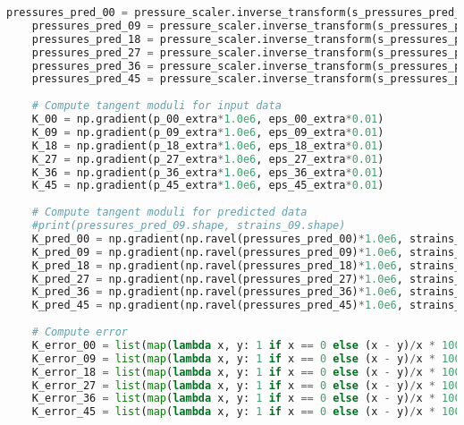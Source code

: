 \begin{lstlisting}[language=Python]
    pressures_pred_00 = pressure_scaler.inverse_transform(s_pressures_pred_00.reshape(-1,1))
    pressures_pred_09 = pressure_scaler.inverse_transform(s_pressures_pred_09.reshape(-1,1))
    pressures_pred_18 = pressure_scaler.inverse_transform(s_pressures_pred_18.reshape(-1,1))
    pressures_pred_27 = pressure_scaler.inverse_transform(s_pressures_pred_27.reshape(-1,1))
    pressures_pred_36 = pressure_scaler.inverse_transform(s_pressures_pred_36.reshape(-1,1))
    pressures_pred_45 = pressure_scaler.inverse_transform(s_pressures_pred_45.reshape(-1,1))
    
    # Compute tangent moduli for input data
    K_00 = np.gradient(p_00_extra*1.0e6, eps_00_extra*0.01)
    K_09 = np.gradient(p_09_extra*1.0e6, eps_09_extra*0.01)
    K_18 = np.gradient(p_18_extra*1.0e6, eps_18_extra*0.01)
    K_27 = np.gradient(p_27_extra*1.0e6, eps_27_extra*0.01)
    K_36 = np.gradient(p_36_extra*1.0e6, eps_36_extra*0.01)
    K_45 = np.gradient(p_45_extra*1.0e6, eps_45_extra*0.01)
    
    # Compute tangent moduli for predicted data
    #print(pressures_pred_09.shape, strains_09.shape)
    K_pred_00 = np.gradient(np.ravel(pressures_pred_00)*1.0e6, strains_00[:,0]*0.01)
    K_pred_09 = np.gradient(np.ravel(pressures_pred_09)*1.0e6, strains_09[:,0]*0.01)
    K_pred_18 = np.gradient(np.ravel(pressures_pred_18)*1.0e6, strains_18[:,0]*0.01)
    K_pred_27 = np.gradient(np.ravel(pressures_pred_27)*1.0e6, strains_27[:,0]*0.01)
    K_pred_36 = np.gradient(np.ravel(pressures_pred_36)*1.0e6, strains_36[:,0]*0.01)
    K_pred_45 = np.gradient(np.ravel(pressures_pred_45)*1.0e6, strains_45[:,0]*0.01)
    
    # Compute error
    K_error_00 = list(map(lambda x, y: 1 if x == 0 else (x - y)/x * 100, K_00, K_pred_00))
    K_error_09 = list(map(lambda x, y: 1 if x == 0 else (x - y)/x * 100, K_09, K_pred_09))
    K_error_18 = list(map(lambda x, y: 1 if x == 0 else (x - y)/x * 100, K_18, K_pred_18))
    K_error_27 = list(map(lambda x, y: 1 if x == 0 else (x - y)/x * 100, K_27, K_pred_27))
    K_error_36 = list(map(lambda x, y: 1 if x == 0 else (x - y)/x * 100, K_36, K_pred_36))
    K_error_45 = list(map(lambda x, y: 1 if x == 0 else (x - y)/x * 100, K_45, K_pred_45))
    

\end{lstlisting}
